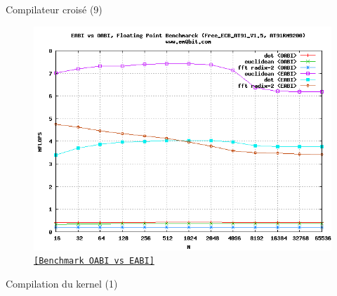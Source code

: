 \documentclass[12pt, t]{beamer}
\newcommand{\src}[2]{\vspace{-10pt}\caption{\href{#1}{\centering \tt \tiny [#2]}}}
\begin{document}
\begin{frame}{Compilateur croisé (9)}

    \begin{figure}
        \centering
        \includegraphics[scale=0.4]{benchmark.png}
        \src{http://archive.linuxgizmos.com/why-arms-eabi-matters/}{Benchmark OABI vs EABI}
    \end{figure}
\end{frame}

\begin{frame}{Compilation du kernel (1)}



\end{frame}
\end{document}

